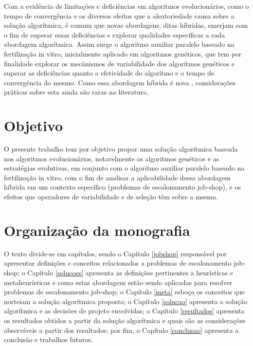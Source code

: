 \documentclass[relatorio,nocolorlinks]{inf-ufg}
\begin{document}
Com a evid\^{e}ncia de limita\c{c}\~{o}es e defici\^{e}ncias em algoritmos evolucion\'{a}rios, como o tempo de converg\^{e}ncia e os diversos
efeitos que a aleatoriedade causa sobre a solu\c{c}\~{a}o algor\'{i}tmica, \'{e} comum que novas abordagens, ditas h\'{i}bridas, emerjam com o fim de
superar essas defici\^{e}ncias e explorar qualidades espec\'{i}ficas a cada abordagem algor\'{i}tmica. Assim surge o algoritmo auxiliar
paralelo baseado na fertiliza\c{c}\~{a}o in vitro, inicialmente aplicado em algoritmos gen\'{e}ticos, que tem por finalidade
explorar os mec\^{a}nismos de variabilidade dos algoritmos gen\'{e}ticos e superar as defici\^{e}ncias quanto a efetividade do algoritmo e o
tempo de converg\^{e}ncia do mesmo. Como essa abordagem h\'{i}brida \'{e} nova \cite{Camilo2011}, considera\c{c}\~{o}es pr\'{a}ticas sobre esta
ainda s\~{a}o raras na literatura.

\section{Objetivo}

O presente trabalho tem por objetivo propor uma solu\c{c}\~{a}o algor\'{i}tmica baseada nos algoritmos evolucion\'{a}rios, notavelmente os
algoritmos gen\'{e}ticos e as estrat\'{e}gias evolutivas, em conjunto com o algoritmo auxiliar paralelo baseado na fertiliza\c{c}\~{a}o in vitro,
com o fim de analisar a aplicabilidade dessa abordagem h\'{i}brida em um contexto espec\'{i}fico (problemas de escalonamento job-shop), e os efeitos
que operadores de variabilidade e de sele\c{c}\~{a}o t\^{e}m sobre a mesma.

\section{Organiza\c{c}\~{a}o da monografia}

O texto divide-se em cap\'{i}tulos, sendo o Cap\'{i}tulo \ref{jobshop} respons\'{a}vel por apresentar defini\c{c}\~{o}es e conceitos relacionados
a problemas de escalonamento job-shop; o Cap\'{i}tulo \ref{solucoes} apresenta as defini\c{c}\~{o}es pertinentes a heur\'{i}sticas e
metaheur\'{i}sticas e como estas abordagens est\~{a}o sendo aplicadas para resolver problemas de escalonamento job-shop; o Cap\'{i}tulo \ref{meta}
esbo\c{c}a os conceitos que norteiam a solu\c{c}\~{a}o algor\'{i}tmica proposta; o Cap\'{i}tulo \ref{solucao} apresenta a solu\c{c}\~{a}o
algor\'{i}tmica e as decis\~{o}es de projeto envolvidas; o Cap\'{i}tulo \ref{resultados} apresenta os resultados obtidos a partir da solu\c{c}\~{a}o
algor\'{i}tmica e quais s\~{a}o as considera\c{c}\~{o}es observ\'{a}veis a partir dos resultados; por fim, o Cap\'{i}tulo \ref{conclusao} apresenta
a conclus\~{a}o e trabalhos futuros.
\end{document}
